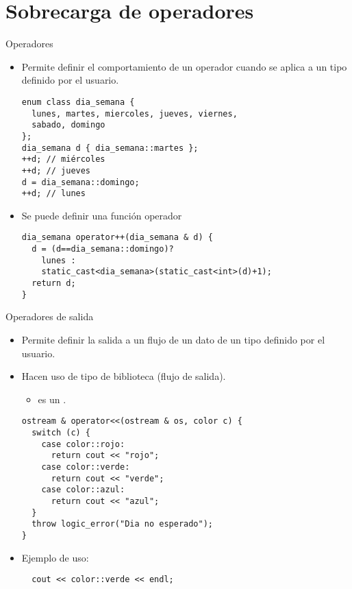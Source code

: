\section{Sobrecarga de operadores}


\begin{frame}[fragile]{Operadores}
\begin{itemize}
  \item Permite definir el comportamiento de un operador cuando
        se aplica a un tipo definido por el usuario.
\begin{lstlisting}
enum class dia_semana { 
  lunes, martes, miercoles, jueves, viernes, 
  sabado, domingo
};
dia_semana d { dia_semana::martes };
++d; // miércoles
++d; // jueves
d = dia_semana::domingo;
++d; // lunes
\end{lstlisting}
  \item Se puede definir una función operador
\begin{lstlisting}
dia_semana operator++(dia_semana & d) {
  d = (d==dia_semana::domingo)?
    lunes :
    static_cast<dia_semana>(static_cast<int>(d)+1);
  return d;
}
\end{lstlisting}
\end{itemize}
\end{frame}

\begin{frame}[fragile]{Operadores de salida}
\begin{itemize}
  \item Permite definir la salida a un flujo de un dato de un tipo definido por el usuario.
  \item Hacen uso de tipo de biblioteca  (flujo de salida).
    \begin{itemize}
      \item {} es un .
    \end{itemize}
\begin{lstlisting}
ostream & operator<<(ostream & os, color c) {
  switch (c) {
    case color::rojo:
      return cout << "rojo";
    case color::verde:
      return cout << "verde";
    case color::azul:
      return cout << "azul";
  }
  throw logic_error("Dia no esperado");
}
\end{lstlisting}
  \item Ejemplo de uso:
\begin{lstlisting}
  cout << color::verde << endl;
\end{lstlisting}
\end{itemize}
\end{frame}

